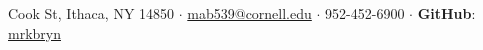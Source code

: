 {
\small \noindent
{} Cook St, Ithaca, NY 14850
$\cdot$
\href{mailto:mab539@cornell.edu}{mab539@cornell.edu}
$\cdot$
952-452-6900
$\cdot$
{\bfseries\small GitHub}: \href{https://github.com/mrkbryn}{mrkbryn}
\hfill

}

